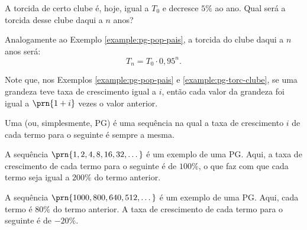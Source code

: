 \begin{example}
\label{example:pg-torc-clube}
A torcida de certo clube é, hoje, igual a $T_0$ e decresce $5\%$ ao ano. Qual será a torcida desse clube daqui a $n$ anos?
\end{example}

\begin{solution}
Analogamente ao Exemplo \ref{example:pg-pop-pais}, a torcida do clube daqui a $n$ anos será:
%
\begin{equation*}
T_n = T_0 \cdot 0{,}95^n.
\end{equation*}
\end{solution}

\begin{remark}
Note que, nos Exemplos \ref{example:pg-pop-pais} e \ref{example:pg-torc-clube}, se uma grandeza teve taxa de crescimento igual a $i$, então cada valor da grandeza foi igual a $\prn{1+i}$ vezes o valor anterior.
\end{remark}

\begin{definition}
Uma  (ou, simplesmente, PG) é uma sequência na qual a taxa de crescimento $i$ de cada termo para o seguinte é sempre a mesma.
\end{definition}

\begin{example}
A sequência $\prn{1, 2, 4, 8, 16, 32, \dots }$ é um exemplo de uma PG. Aqui, a taxa de crescimento de cada termo para o seguinte é de $100 \% $, o que faz com que cada termo seja igual a $200 \% $ do termo anterior.
\end{example}

\begin{example}
A sequência $\prn{1000, 800, 640, 512 , \dots }$ é um exemplo de uma PG. Aqui, cada termo é $80 \% $ do termo anterior. A taxa de crescimento de cada termo para o seguinte é de $ -20 \% $.
\end{example}